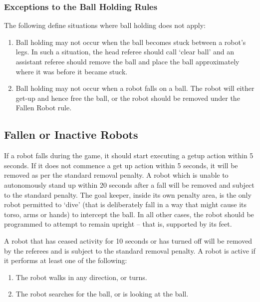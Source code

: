 \documentclass[12pt]{article}
\begin{document}
\subsubsection{Exceptions to the Ball Holding Rules}
\label{sec:situations_no_ball_holding}

The following define situations where ball holding does not apply:

\begin{enumerate}
	\item Ball holding may not occur when the ball becomes stuck between a robot's legs.  In such a situation, the head referee should call `clear ball' and an assistant referee should remove the ball and place the ball approximately where it was before it became stuck.
	\item Ball holding may not occur when a robot falls on a ball.  The robot will either get-up and hence free the ball, or the robot should be removed under the Fallen Robot rule.
\end{enumerate}


\subsection{Fallen or Inactive Robots}
\label{sec:fallenrobots}

If a robot falls during the game, it should start executing a getup action within 5 seconds. If it does not commence a get up action within 5 seconds, it will be removed as per the standard removal penalty. A robot which is unable to autonomously stand up within 20 seconds after a fall will be removed and subject to the standard penalty. The goal keeper, inside its own penalty area, is the only robot permitted to `dive' (that is deliberately fall in a way that might cause its torso, arms or hands) to intercept the ball. In all other cases, the robot should be programmed to attempt to remain upright -- that is, supported by its feet.

A robot that has ceased activity for 10 seconds or has turned off will be removed by the referees and is subject to the standard removal penalty. A robot is active if it performs at least one of the following:

\begin{enumerate}

\item The robot walks in any direction, or turns.

\item The robot searches for the ball, or is looking at the ball.

\end{enumerate}
\end{document}
